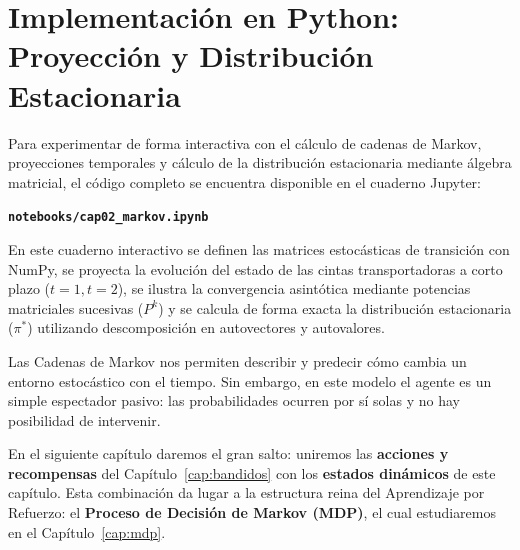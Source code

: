 \section{Implementación en Python: Proyección y Distribución Estacionaria}
Para experimentar de forma interactiva con el cálculo de cadenas de Markov, proyecciones temporales y cálculo de la distribución estacionaria mediante álgebra matricial, el código completo se encuentra disponible en el cuaderno Jupyter:
\begin{center}
  \textbf{\texttt{notebooks/cap02\_markov.ipynb}}
\end{center}
En este cuaderno interactivo se definen las matrices estocásticas de transición con NumPy, se proyecta la evolución del estado de las cintas transportadoras a corto plazo ($t=1, t=2$), se ilustra la convergencia asintótica mediante potencias matriciales sucesivas ($P^k$) y se calcula de forma exacta la distribución estacionaria ($\pi^*$) utilizando descomposición en autovectores y autovalores.

\begin{notabox}
Las Cadenas de Markov nos permiten describir y predecir cómo cambia un entorno estocástico con el tiempo. Sin embargo, en este modelo el agente es un simple espectador pasivo: las probabilidades ocurren por sí solas y no hay posibilidad de intervenir.

En el siguiente capítulo daremos el gran salto: uniremos las \textbf{acciones y recompensas} del Capítulo~\ref{cap:bandidos} con los \textbf{estados dinámicos} de este capítulo. Esta combinación da lugar a la estructura reina del Aprendizaje por Refuerzo: el \textbf{Proceso de Decisión de Markov (MDP)}, el cual estudiaremos en el Capítulo~\ref{cap:mdp}.
\end{notabox}
